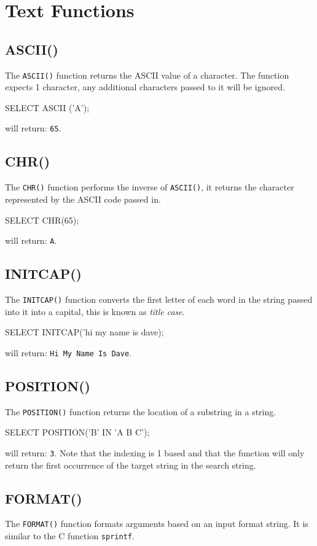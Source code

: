 
\section*{Text Functions}
\subsection*{ASCII()}
The \verb|ASCII()| function returns the ASCII value of a character. The function expects 1 character, any additional characters passed to it will be ignored.
\begin{sql}
SELECT ASCII ('A');
\end{sql}
will return: \verb|65|.

\subsection*{CHR()}
The \verb|CHR()| function performs the inverse of \verb|ASCII()|, it returns the character represented by the ASCII code passed in.
\begin{sql}
SELECT CHR(65);
\end{sql}
will return: \verb|A|.

\subsection*{INITCAP()}
The \verb|INITCAP()| function converts the first letter of each word in the string passed into it into a capital, this is known as \textit{title case}.
\begin{sql}
SELECT INITCAP('hi my name is dave);
\end{sql}
will return: \verb|Hi My Name Is Dave|.

\subsection*{POSITION()}
The \verb|POSITION()| function returns the location of a substring in a string.
\begin{sql}
SELECT POSITION('B' IN 'A B C');
\end{sql}
will return: \verb|3|. Note that the indexing is 1 based and that the function will only return the first occurrence of the target string in the search string.

\subsection*{FORMAT()}
The \verb|FORMAT()| function formats arguments based on an input format string. It is similar to the C function \verb|sprintf|.

